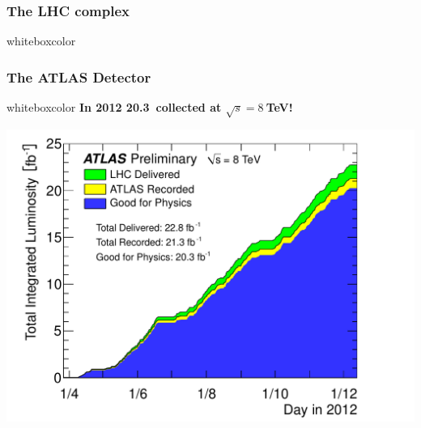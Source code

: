 

\begin{frame}\frametitle{The LHC complex}
\footnotesize\centering
\begin{minipage}{.9\textwidth}
\pause
\begin{beamercolorbox}[wd=.99\textwidth,rounded=true,shadow=true]{whiteboxcolor}\centering\scriptsize

\end{beamercolorbox}

\end{minipage}

\myskip

\end{frame}



\begin{frame}\frametitle{The ATLAS Detector}
\footnotesize\centering

\begin{minipage}{.6\textwidth}\centering\pause
\hspace{2cm}\begin{beamercolorbox}[wd=.9\textwidth,rounded=true,shadow=true]{whiteboxcolor}\centering
{\bfseries In 2012 20.3\ifb\  collected at $\sqrt{s}=8~$TeV!}
\vspace{.3cm}

\includegraphics[width=.8\textwidth]{pics/intlumivstime2012DQ}

\vspace{\baselineskip}
\end{beamercolorbox}

\end{minipage}


\end{frame}
